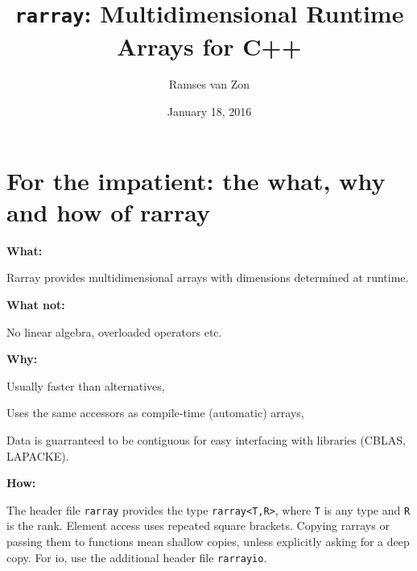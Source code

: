 \documentclass[11pt,twoside]{article}
\newcommand{\cxx}{C{++}}
\begin{document}
\setlength{\parskip}{1mm}

\title{\texttt{rarray}: Multidimensional Runtime Arrays for \cxx}

\author{Ramses van Zon%
\vspace{-8pt}} 

\date{January 18, 2016\vspace{-7mm}}

\maketitle

\section{For the impatient: the what, why and how of rarray}

\noindent\textbf{What:}

Rarray provides multidimensional arrays with dimensions determined at runtime. 

\noindent\textbf{What not:} 

No linear algebra, overloaded operators etc.

\noindent\textbf{Why:} 

Usually faster than alternatives,

Uses the same accessors as compile-time (automatic) arrays,

Data is guarranteed to be contiguous for easy interfacing with
libraries (CBLAS, LAPACKE).

\noindent\textbf{How:}

The header file \texttt{rarray} provides the type \texttt{rarray<T,R>}, where \texttt{T} is any type and {\tt R} is the rank. Element access uses repeated square brackets. Copying rarrays or passing them to functions mean shallow copies, unless explicitly asking for a deep copy. For io, use the additional header file \texttt{rarrayio}.

\
\end{document}
